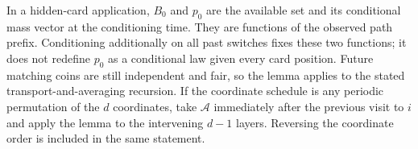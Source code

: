 In a hidden-card application, $B_0$ and $p_0$ are the available set and
its conditional mass vector at the conditioning time. They are functions
of the observed path prefix. Conditioning additionally on all past
switches fixes these two functions; it does not redefine $p_0$ as a
conditional law given every card position. Future matching coins are
still independent and fair, so the lemma applies to the stated
transport-and-averaging recursion. If the coordinate schedule is any
periodic permutation of the $d$ coordinates, take $\mathcal A$ immediately
after the previous visit to $i$ and apply the lemma to the intervening $d-1$
layers. Reversing the coordinate order is included in the same statement.

